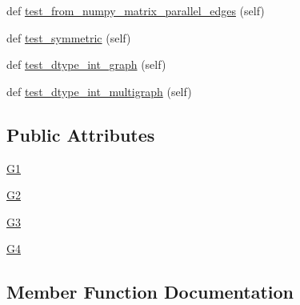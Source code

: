 \begin{DoxyCompactItemize}
\item 
def \hyperlink{classnetworkx_1_1tests_1_1test__convert__numpy_1_1TestConvertNumpyMatrix_a1d7f939a202800fa051a6621b3fdfae1}{test\+\_\+from\+\_\+numpy\+\_\+matrix\+\_\+parallel\+\_\+edges} (self)
\item 
def \hyperlink{classnetworkx_1_1tests_1_1test__convert__numpy_1_1TestConvertNumpyMatrix_a2d211248c865ff4550dedc715589904c}{test\+\_\+symmetric} (self)
\item 
def \hyperlink{classnetworkx_1_1tests_1_1test__convert__numpy_1_1TestConvertNumpyMatrix_a74e64f10d81e8dcb22f897bfb0f20286}{test\+\_\+dtype\+\_\+int\+\_\+graph} (self)
\item 
def \hyperlink{classnetworkx_1_1tests_1_1test__convert__numpy_1_1TestConvertNumpyMatrix_a9f548627a0d8b699aacec747bcb8b7c1}{test\+\_\+dtype\+\_\+int\+\_\+multigraph} (self)
\end{DoxyCompactItemize}
\subsection*{Public Attributes}
\begin{DoxyCompactItemize}
\item 
\hyperlink{classnetworkx_1_1tests_1_1test__convert__numpy_1_1TestConvertNumpyMatrix_a5363607f63572ed6e00951d9c6787702}{G1}
\item 
\hyperlink{classnetworkx_1_1tests_1_1test__convert__numpy_1_1TestConvertNumpyMatrix_a73e5b82acc8a1295d09a508b2fc9fe20}{G2}
\item 
\hyperlink{classnetworkx_1_1tests_1_1test__convert__numpy_1_1TestConvertNumpyMatrix_afa03c9605ebccb03400273483f5d42c1}{G3}
\item 
\hyperlink{classnetworkx_1_1tests_1_1test__convert__numpy_1_1TestConvertNumpyMatrix_a2a8a236b15aa902dc69b289735bbcc69}{G4}
\end{DoxyCompactItemize}


\subsection{Member Function Documentation}
\mbox{\label{classnetworkx_1_1tests_1_1test__convert__numpy_1_1TestConvertNumpyMatrix_ac9345c35a87330229010d033241d8af7}} 
